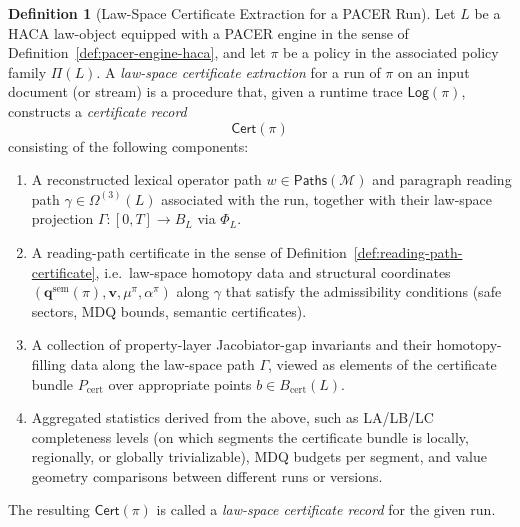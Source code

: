 \documentclass[11pt]{book}
\theoremstyle{plain}
\theoremstyle{definition}
\newtheorem{definition}[theorem]{Definition}
\theoremstyle{remark}
\begin{document}
\begin{definition}[Law-Space Certificate Extraction for a PACER Run]
\label{def:lawspace-certificate-extraction}
Let $L$ be a HACA law-object equipped with a PACER engine in the sense
of Definition~\ref{def:pacer-engine-haca}, and let $\pi$ be a policy
in the associated policy family $\Pi(L)$. A \emph{law-space certificate
extraction} for a run of $\pi$ on an input document (or stream) is a
procedure that, given a runtime trace $\mathsf{Log}(\pi)$, constructs
a \emph{certificate record}
\[
  \mathsf{Cert}(\pi)
\]
consisting of the following components:
\begin{enumerate}
  \item A reconstructed lexical operator path $w\in\mathsf{Paths}(\mathcal{M})$
        and paragraph reading path $\gamma\in\Omega^{(3)}(L)$ associated
        with the run, together with their law-space projection
        $\Gamma:[0,T]\to B_L$ via $\Phi_L$.
  \item A reading-path certificate in the sense of
        Definition~\ref{def:reading-path-certificate}, i.e.\ law-space
        homotopy data and structural coordinates
        $(\mathbf{q}^{\mathrm{sem}}(\pi),\mathbf{v},\mu^\pi,\alpha^\pi)$
        along $\gamma$ that satisfy the admissibility conditions
        (safe sectors, MDQ bounds, semantic certificates).
  \item A collection of property-layer Jacobiator-gap invariants and
        their homotopy-filling data along the law-space path $\Gamma$,
        viewed as elements of the certificate bundle
        $P_{\mathrm{cert}}$ over appropriate points
        $b\in B_{\mathrm{cert}}(L)$.
  \item Aggregated statistics derived from the above, such as LA/LB/LC
        completeness levels (on which segments the certificate bundle
        is locally, regionally, or globally trivializable), MDQ
        budgets per segment, and value geometry comparisons between
        different runs or versions.
\end{enumerate}
The resulting $\mathsf{Cert}(\pi)$ is called a \emph{law-space
certificate record} for the given run.
\end{definition}
\end{document}
